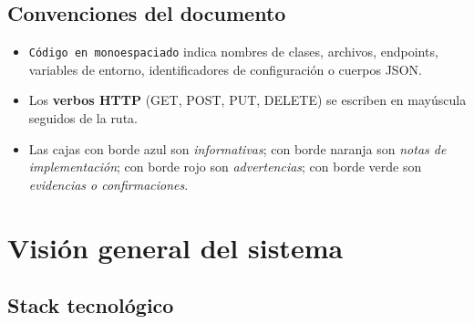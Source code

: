 \documentclass[11pt,a4paper,oneside]{article}
\newcommand{\code}[1]{\texttt{\small #1}}
\begin{document}
\subsection{Convenciones del documento}

\begin{itemize}[leftmargin=*]
  \item \code{Código en monoespaciado} indica nombres de clases, archivos, endpoints, variables
        de entorno, identificadores de configuración o cuerpos JSON.
  \item Los \textbf{verbos HTTP} (GET, POST, PUT, DELETE) se escriben en mayúscula seguidos de
        la ruta.
  \item Las cajas con borde azul son \emph{informativas}; con borde naranja son \emph{notas
        de implementación}; con borde rojo son \emph{advertencias}; con borde verde son
        \emph{evidencias o confirmaciones}.
\end{itemize}

\section{Visión general del sistema}

\subsection{Stack tecnológico}
\end{document}
